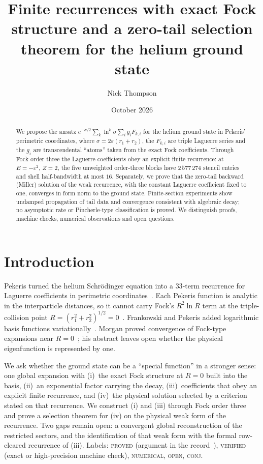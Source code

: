 \documentclass[aps,pra,twocolumn,superscriptaddress,nofootinbib]{revtex4-2}
\theoremstyle{remark}
\newcommand{\lab}[1]{\textup{\textsc{#1}}}
\begin{document}
\title{Finite recurrences with exact Fock structure and a zero-tail selection theorem for the helium ground state}
\author{Nick Thompson}
\date{October 2026}

\begin{abstract}
We propose the ansatz $e^{-\sigma/2}\sum_k \ln^k\sigma\sum_i g_iF_{k,i}$ for the helium ground state in Pekeris' perimetric coordinates, where $\sigma=2\varepsilon(r_1+r_2)$, the $F_{k,i}$ are triple Laguerre series and the $g_i$ are transcendental ``atoms'' taken from the exact Fock coefficients.
Through Fock order three the Laguerre coefficients obey an explicit finite recurrence: at $E=-\varepsilon^2$, $Z=2$, the five unweighted order-three blocks have $2\,577\,274$ stencil entries and shell half-bandwidth at most $16$.
Separately, we prove that the zero-tail backward (Miller) solution of the weak recurrence, with the constant Laguerre coefficient fixed to one, converges in form norm to the ground state.
Finite-section experiments show undamped propagation of tail data and convergence consistent with algebraic decay; no asymptotic rate or Pincherle-type classification is proved.
We distinguish proofs, machine checks, numerical observations and open questions.
\end{abstract}

\maketitle

\section{Introduction}
Pekeris turned the helium Schr\"odinger equation into a $33$-term recurrence for Laguerre coefficients in perimetric coordinates~\cite{Pekeris1958,Pekeris1959,KZ2011}.
Each Pekeris function is analytic in the interparticle distances, so it cannot carry Fock's $R^2\ln R$ term at the triple-collision point $R=(r_1^2+r_2^2)^{1/2}=0$~\cite{Fock1954,FHOS2005}.
Frankowski and Pekeris added logarithmic basis functions variationally~\cite{FP1966}.
Morgan proved convergence of Fock-type expansions near $R=0$~\cite{Morgan1986}; his abstract leaves open whether the physical eigenfunction is represented by one.

We ask whether the ground state can be a ``special function'' in a stronger sense: one global expansion with (i)~the exact Fock structure at $R=0$ built into the basis, (ii)~an exponential factor carrying the decay, (iii)~coefficients that obey an explicit finite recurrence, and (iv)~the physical solution selected by a criterion stated on that recurrence.
We construct (i) and (iii) through Fock order three and prove a selection theorem for (iv) on the physical weak form of the recurrence.
Two gaps remain open: a convergent global reconstruction of the restricted sectors, and the identification of that weak form with the formal row-cleared recurrence of (iii).
Labels: \lab{proved} (argument in the record~\cite{record}), \lab{verified} (exact or high-precision machine check), \lab{numerical}, \lab{open}, \lab{conj}.
\end{document}
